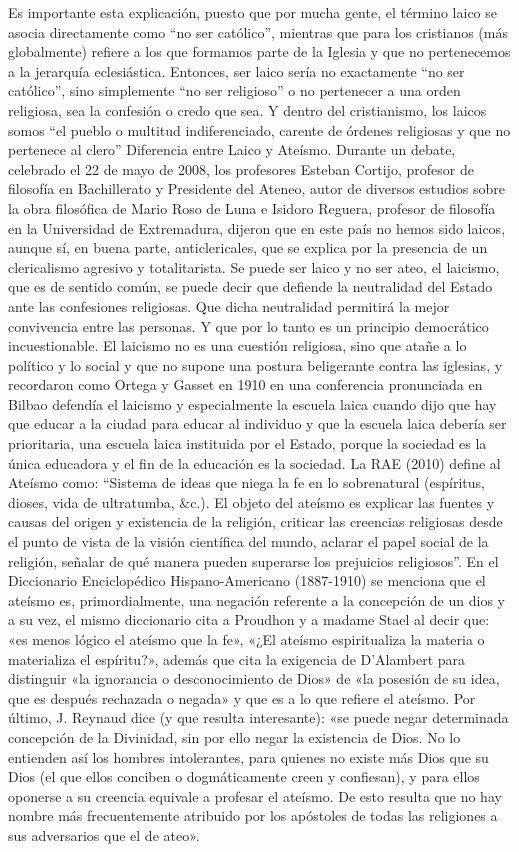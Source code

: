 Es importante esta explicación, puesto que por mucha gente, el término laico se asocia directamente como “no ser católico”, mientras que para los cristianos (más globalmente) refiere a los que formamos parte de la Iglesia y que no pertenecemos a la jerarquía eclesiástica. Entonces, ser laico sería no exactamente “no ser católico”, sino simplemente “no ser religioso” o no pertenecer a una orden religiosa, sea la confesión o credo que sea. Y dentro del cristianismo, los laicos somos “el pueblo o multitud indiferenciado, carente de órdenes religiosas y que no pertenece al clero”
Diferencia entre Laico y Ateísmo.
Durante un debate, celebrado el 22 de mayo de 2008, los profesores Esteban Cortijo, profesor de filosofía en Bachillerato y Presidente del Ateneo, autor de diversos estudios sobre la obra filosófica de Mario Roso de Luna e Isidoro Reguera, profesor de filosofía en la Universidad de Extremadura, dijeron que en este país no hemos sido laicos, aunque sí, en buena parte, anticlericales, que se explica por la presencia de un clericalismo agresivo y totalitarista. Se puede ser laico y no ser ateo, el laicismo, que es de sentido común, se puede decir que defiende la neutralidad del Estado ante las confesiones religiosas. Que dicha neutralidad permitirá la mejor convivencia entre las personas. Y que por lo tanto es un principio democrático incuestionable. El laicismo no es una cuestión religiosa, sino que atañe a lo político y lo social y que no supone una postura beligerante contra las iglesias, y recordaron como Ortega y Gasset en 1910 en una conferencia pronunciada en Bilbao defendía el laicismo y especialmente la escuela laica cuando dijo que hay que educar a la ciudad para educar al individuo y que la escuela laica debería ser prioritaria, una escuela laica instituida por el Estado, porque la sociedad es la única educadora y el fin de la educación es la sociedad.
La RAE (2010) define al Ateísmo como: “Sistema de ideas que niega la fe en lo sobrenatural (espíritus, dioses, vida de ultratumba, &c.). El objeto del ateísmo es explicar las fuentes y causas del origen y existencia de la religión, criticar las creencias religiosas desde el punto de vista de la visión científica del mundo, aclarar el papel social de la religión, señalar de qué manera pueden superarse los prejuicios religiosos”.
En el Diccionario Enciclopédico Hispano-Americano (1887-1910) se menciona que el ateísmo es, primordialmente, una negación referente a la concepción de un dios y a su vez, el mismo diccionario cita a Proudhon y a madame Stael al decir que: «es menos lógico el ateísmo que la fe», «¿El ateísmo espiritualiza la materia o materializa el espíritu?», además que cita la exigencia de D'Alambert para distinguir «la ignorancia o desconocimiento de Dios» de «la posesión de su idea, que es después rechazada o negada» y que es a lo que refiere el ateísmo. Por último, J. Reynaud dice (y que resulta interesante): «se puede negar determinada concepción de la Divinidad, sin por ello negar la existencia de Dios. No lo entienden así los hombres intolerantes, para quienes no existe más Dios que su Dios (el que ellos conciben o dogmáticamente creen y confiesan), y para ellos oponerse a su creencia equivale a profesar el ateísmo. De esto resulta que no hay nombre más frecuentemente atribuido por los apóstoles de todas las religiones a sus adversarios que el de ateo».
